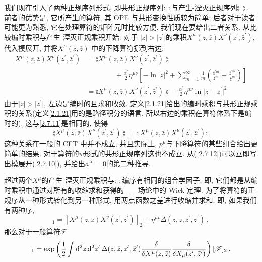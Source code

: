 我们现在引入了两种正规序列形式, 即共形正规序列$\mathrel{:\::}$与产生-湮灭正规序列$\mathrel{\typecolon\:\typecolon}$. 前者的优势是, 它所产生的算符, 其 OPE 与共形变换性质较为简单; 后者对于读者可能更为熟悉, 它在处理算符的矩阵元时比较方便. 我们现在要给出二者关系. 从比较编时乘积与产生-湮灭正规乘积开始. 对于 $\lvert z \rvert >\lvert z^{\prime}\rvert$的乘积$X^{\mu}(z, \bar{z}) X^{\nu}(z^{\prime}, \bar{z}^{\prime})$, 代入模展开, 并将$X^{\mu}(z, \bar{z})$ 中的下降算符挪到右边:
\begin{align}
X^{\mu}(z, \bar{z}) X^{\nu}(z^{\prime}, \bar{z}^{\prime}) &=  \mathrel{\typecolon X^{\mu}(z, \bar{z}) X^{\nu}(z^{\prime}, \bar{z}^{\prime}) \typecolon}  \nonumber \\
&\qquad \qquad +\frac{\alpha^{\prime}}{2} \eta^{\mu \nu}\left[-\ln |z|^{2}+\sum_{m=1}^{\infty} \frac{1}{m}\left(\frac{z^{\prime m}}{z^{m}}+\frac{\bar{z}^{\prime m}}{\bar{z}^{m}}\right)\right] \nonumber \\
&=\mathrel{\typecolon X^{\mu}(z, \bar{z}) X^{\nu}(z^{\prime}, \bar{z}^{\prime}) \typecolon}-\frac{\alpha^{\prime}}{2} \eta^{\mu \nu}\ln \lvert z-z^\prime\rvert^{2} \label{2.7.11}
\end{align}
由于$|z|>\lvert z^{\prime}\rvert$, 左边是编时的且求和收敛. 定义\eqref{2.1.21}给出的编时乘积与共形正规乘积的关系(定义\eqref{2.1.21}用的是路径积分的语言, 所以右边的乘积在算符体系下是编时的). 这与\eqref{2.7.11}是相同的, 使得
\begin{equation}\label{2.7.12}
\mathrel{\typecolon X^{\mu}(z, \bar{z}) X^{\nu}(z^{\prime}, \bar{z}^{\prime})\typecolon} = \mathrel{: X^{\mu}(z, \bar{z}) X^{\nu}(z^{\prime}, \bar{z}^{\prime})}:
\end{equation}
这种关系在一般的 CFT 中并不成立, 并且实际上, $p^\mu$与下降算符的某些组合给出更简单的结果. 对于算符的$w$形式的共形正规序列这也不成立.
从(\ref{2.7.12})可以立即写出模展开(\ref{2.7.10}), 并给出$a^{X}=0$的第二种推导.

超过两个$X^\mu$的产生-湮灭正规乘积与$\mathrel{:\::}$编序有相同的组合学因子. 即, 它们都是从编时乘积中通过对所有的收缩求和获得的——场论中的 Wick 定理. 
为了将算符的正规序从一种形式转化到另一种形式, 用两点函数之差进行收缩并求和. 即, 如果我们有两种序,
\begin{equation}
[X^{\mu}(z, \bar{z}) X^{v}(z^{\prime}, \bar{z}^{\prime})]_{1} = [X^{\mu}(z, \bar{z}) X^{v}(z^{\prime}, \bar{z}^{\prime})]_{2} 
+\eta^{\mu v} \Delta (z, \bar{z}, z^{\prime}, \bar{z}^{\prime}) \:, \label{2.7.13}
\end{equation}
那么对于一般算符$\mathscr{F}$
\begin{equation}
[\mathscr{F}]_{1}=\exp \left(\frac{1}{2} \int \dif^{2} z\, \dif^{2} z^{\prime}\: \Delta(z, \bar{z}, z^{\prime}, \bar{z}^{\prime}) \frac{\delta}{\delta X^{\mu}(z, \bar{z})} \frac{\delta}{\delta X_{\mu}(z^{\prime}, \bar{z}^{\prime})}\right)[\mathscr{F}]_{2} \:. \label{2.7.14}
\end{equation}

